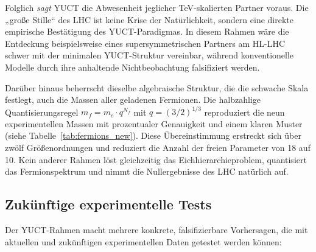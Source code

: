 \documentclass[11pt,a4paper]{article}
\begin{document}
	Folglich \emph{sagt} YUCT die Abwesenheit jeglicher TeV-skalierten Partner voraus. Die „große Stille“ des LHC ist keine Krise der Natürlichkeit, sondern eine direkte empirische Bestätigung des YUCT-Paradigmas. In diesem Rahmen wäre die Entdeckung beispielsweise eines supersymmetrischen Partners am HL-LHC schwer mit der minimalen YUCT-Struktur vereinbar, während konventionelle Modelle durch ihre anhaltende Nichtbeobachtung falsifiziert werden.
	
	Darüber hinaus beherrscht dieselbe algebraische Struktur, die die schwache Skala festlegt, auch die Massen aller geladenen Fermionen. Die halbzahlige Quantisierungsregel $m_f = m_e \cdot q^{N_f}$ mit $q = (3/2)^{1/3}$ reproduziert die neun experimentellen Massen mit prozentualer Genauigkeit und einem klaren Muster (siehe Tabelle~\ref{tab:fermions_new}). Diese Übereinstimmung erstreckt sich über zwölf Größenordnungen und reduziert die Anzahl der freien Parameter von 18 auf 10. Kein anderer Rahmen löst gleichzeitig das Eichhierarchieproblem, quantisiert das Fermionspektrum und nimmt die Nullergebnisse des LHC natürlich auf.
	
	\subsection{Zukünftige experimentelle Tests}
	
	Der YUCT-Rahmen macht mehrere konkrete, falsifizierbare Vorhersagen, die mit aktuellen und zukünftigen experimentellen Daten getestet werden können:
	
\end{document}
